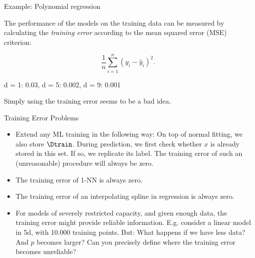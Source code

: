 \begin{frame}{Example: Polynomial regression}

The performance of the models on the training data can be measured by
calculating the \emph{training error} according to the mean squared
error (MSE) criterion:

\[ \frac{1}{n} \sum_{i = 1}^{n}(y_i - \hat{y}_i)^2\text{.} \]

d = 1: 0.03, \qquad d = 5: 0.002, \qquad d = 9: 0.001

Simply using the training error seems to be a bad idea.

\end{frame}

\begin{frame}{Training Error Problems}

\begin{itemize}
\item
  Extend any ML training in the following way: On top of normal fitting,
  we also store \(\Dtrain\). During prediction, we first check whether
  \(x\) is already stored in this set. If so, we replicate its label.
  The training error of such an (unreasonable) procedure will always be
  zero.
\item
  The training error of 1-NN is always zero.
\item
  The training error of an interpolating spline in regression is always
  zero.
\item
  For models of severely restricted capacity, and given enough data, the
  training error might provide reliable information. E.g. consider a
  linear model in 5d, with 10.000 training points. But: What happens if
  we have less data? And \(p\) becomes larger? Can you precisely define
  where the training error becomes unreliable?
\end{itemize}

\end{frame}

